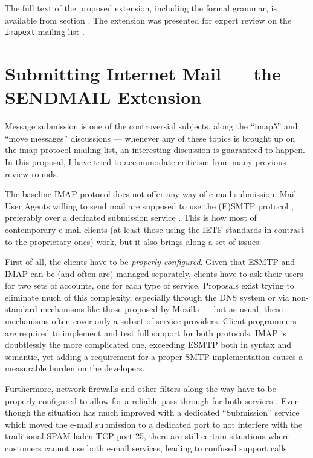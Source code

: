 \documentclass[trojita]{subfiles}
\begin{document}
The full text of the proposed extension, including the formal grammar, is available from section
.  The extension was presented for expert review on the {\tt imapext} mailing list
\cite{jkt-i-p-draft-incthread}.

\section{Submitting Internet Mail --- the SENDMAIL Extension}
\label{sec:draft-sendmail}

Message submission is one of the controversial subjects, along the ``imap5'' and ``move messages'' discussions ---
whenever any of these topics is brought up on the imap-protocol mailing list, an interesting discussion is guaranteed to
happen.  In this proposal, I have tried to accommodate criticism from many previous review rounds.

The baseline IMAP protocol does not offer any way of e-mail submission.  Mail User Agents willing to send mail are
supposed to use the (E)SMTP protocol \cite{rfc5321} \cite{rfc2821}, preferably over a dedicated submission service
\cite{rfc6409}.  This is how most of contemporary e-mail clients (at least those using the IETF standards in contrast
to the proprietary ones) work, but it also brings along a set of issues.

First of all, the clients have to be {\em properly configured}.  Given that ESMTP and IMAP can be (and often are)
managed separately, clients have to ask their users for two sets of accounts, one for each type of service.  Proposals
exist trying to eliminate much of this complexity, especially through the DNS system \cite{rfc6186} or via non-standard
mechanisms like those proposed by Mozilla \cite{mozilla-ispdb} --- but as usual, these mechanisms often cover only a
subset of service providers.  Client programmers are required to implement and test full support for both protocols.
IMAP is doubtlessly the more complicated one, exceeding ESMTP both in syntax and semantic, yet adding a requirement for
a proper SMTP implementation causes a measurable burden on the developers.

Furthermore, network firewalls and other filters along the way have to be properly configured to allow for a reliable
pass-through for both services \cite{crocker-beep-multi-conns}.  Even though the situation has much improved with a
dedicated ``Submission'' service \cite{rfc6409} which moved the e-mail submission to a dedicated port to not interfere
with the traditional SPAM-laden TCP port 25, there are still certain situations where customers cannot use both e-mail
services, leading to confused support calls \cite{submission-users-suck-smtp-imap} \cite{panozzo-submission-users-suck}.
\end{document}
